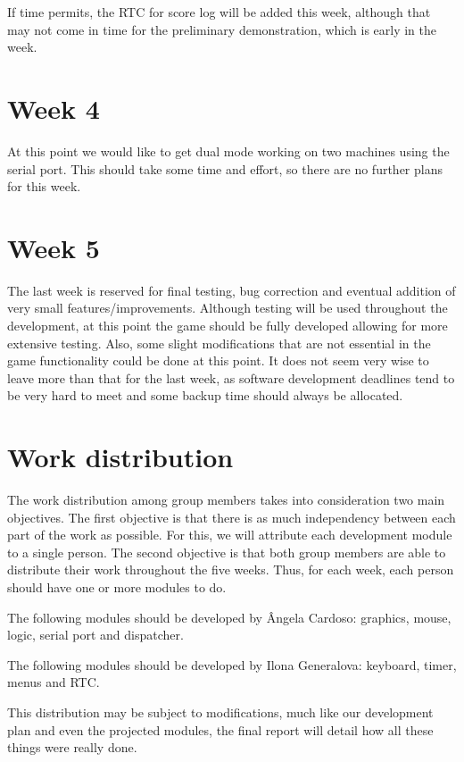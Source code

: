 \documentclass[11pt,a4paper,reqno]{report}
\numberwithin{equation}{section}
\begin{document}
If time permits, the RTC for score log will be added this week, although that may not come in time for the preliminary demonstration, which is early in the week.

\section{Week 4}

At this point we would like to get dual mode working on two machines using the serial port. This should take some time and effort, so there are no further plans for this week.

\section{Week 5}

The last week is reserved for final testing, bug correction and eventual addition of very small features/improvements. Although testing will be used throughout the development, at this point the game should be fully developed allowing for more extensive testing. Also, some slight modifications that are not essential in the game functionality could be done at this point. It does not seem very wise to leave more than that for the last week, as software development deadlines tend to be very hard to meet and some backup time should always be allocated.

\section{Work distribution}

The work distribution among group members takes into consideration two main objectives. The first objective is that there is as much independency between each part of the work as possible. For this, we will attribute each development module to a single person. The second objective is that both group members are able to distribute their work throughout the five weeks. Thus, for each week, each person should have one or more modules to do.

The following modules should be developed by Ângela Cardoso: graphics, mouse, logic, serial port and dispatcher.

The following modules should be developed by Ilona Generalova: keyboard, timer, menus and RTC.

This distribution may be subject to modifications, much like our development plan and even the projected modules, the final report will detail how all these things were really done.
\end{document}
